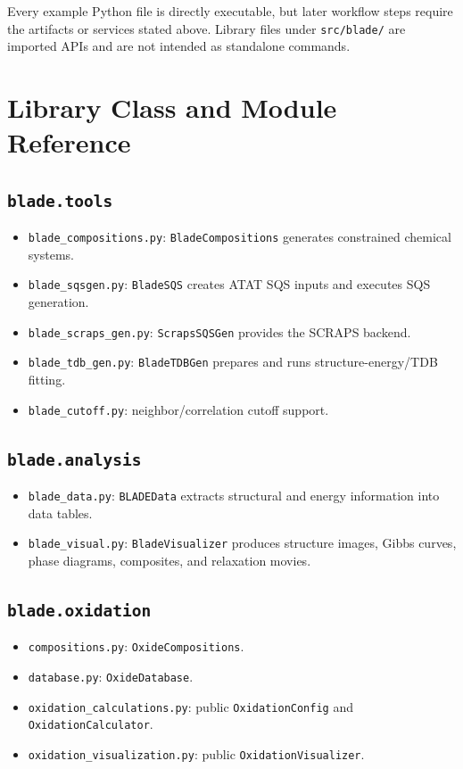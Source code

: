 \documentclass[11pt,letterpaper]{article}
\newcommand{\file}[1]{\nolinkurl{#1}}
\begin{document}
Every example Python file is directly executable, but later workflow steps
require the artifacts or services stated above. Library files under
\file{src/blade/} are imported APIs and are not intended as standalone
commands.

\section{Library Class and Module Reference}

\subsection{\texttt{blade.tools}}

\begin{itemize}
  \item \file{blade_compositions.py}: \file{BladeCompositions} generates
  constrained chemical systems.
  \item \file{blade_sqsgen.py}: \file{BladeSQS} creates ATAT SQS inputs and
  executes SQS generation.
  \item \file{blade_scraps_gen.py}: \file{ScrapsSQSGen} provides the SCRAPS
  backend.
  \item \file{blade_tdb_gen.py}: \file{BladeTDBGen} prepares and runs
  structure-energy/TDB fitting.
  \item \file{blade_cutoff.py}: neighbor/correlation cutoff support.
\end{itemize}

\subsection{\texttt{blade.analysis}}

\begin{itemize}
  \item \file{blade_data.py}: \file{BLADEData} extracts structural and energy
  information into data tables.
  \item \file{blade_visual.py}: \file{BladeVisualizer} produces structure
  images, Gibbs curves, phase diagrams, composites, and relaxation movies.
\end{itemize}

\subsection{\texttt{blade.oxidation}}

\begin{itemize}
  \item \file{compositions.py}: \file{OxideCompositions}.
  \item \file{database.py}: \file{OxideDatabase}.
  \item \file{oxidation_calculations.py}: public \file{OxidationConfig} and
  \file{OxidationCalculator}.
  \item \file{oxidation_visualization.py}: public
  \file{OxidationVisualizer}.
\end{itemize}
\end{document}
